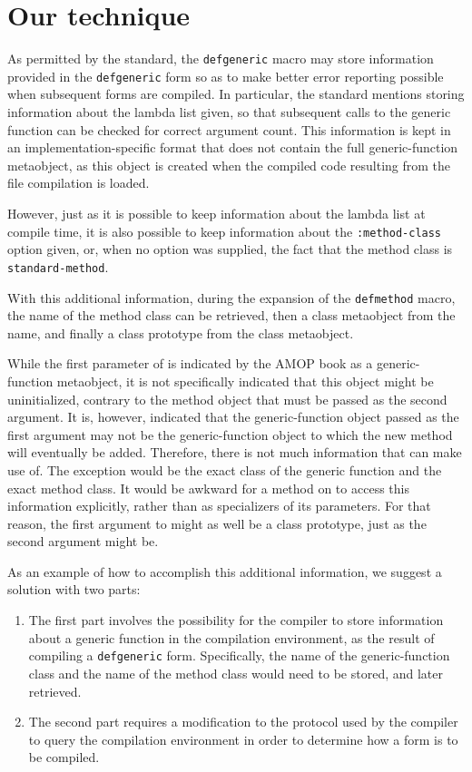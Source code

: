 \section{Our technique}

As permitted by the \commonlisp{} standard, the \texttt{defgeneric}
macro may store information provided in the \texttt{defgeneric} form
so as to make better error reporting possible when subsequent forms
are compiled.  In particular, the standard mentions storing
information about the lambda list given, so that subsequent calls to
the generic function can be checked for correct argument count.
This information is kept in an implementation-specific format that
does not contain the full generic-function metaobject, as this object
is created when the compiled code resulting from the file compilation
is loaded.

However, just as it is possible to keep information about the lambda
list at compile time, it is also possible to keep information about
the \texttt{:method-class} option given, or, when no option was
supplied, the fact that the method class is \texttt{standard-method}.

With this additional information, during the expansion of the
\texttt{defmethod} macro, the name of the method class can be
retrieved, then a class metaobject from the name, and finally a class
prototype from the class metaobject.

While the first parameter of \mml{} is indicated by the AMOP book as a
generic-function metaobject, it is not specifically indicated that
this object might be uninitialized, contrary to the method object that
must be passed as the second argument.  It is, however, indicated that
the generic-function object passed as the first argument may not be
the generic-function object to which the new method will eventually be
added.  Therefore, there is not much information that \mml{} can make
use of.  The exception would be the exact class of the generic
function and the exact method class.  It would be awkward for a method
on \mml{} to access this information explicitly, rather than as
specializers of its parameters.  For that reason, the first argument
to \mml{} might as well be a class prototype, just as the second
argument might be.

As an example of how to accomplish this additional information, we
suggest a solution with two parts:

\begin{enumerate}
\item The first part involves the possibility for the compiler to
  store information about a generic function in the compilation
  environment, as the result of compiling a \texttt{defgeneric} form.
  Specifically, the name of the generic-function class and the name of
  the method class would need to be stored, and later retrieved.
\item The second part requires a modification to the protocol used by
  the compiler to query the compilation environment in order to
  determine how a form is to be compiled.
\end{enumerate}


